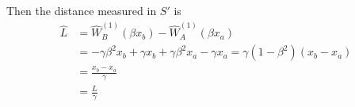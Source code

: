 \documentclass[12pt]{article}
\begin{document}
Then the distance measured in $S'$ is $$\begin{aligned}
\widehat{L} & =  \widehat{W}_B^{(1)}(\beta x_b) - \widehat{W}_A^{(1)}(\beta x_a)\\
   & = -\gamma\beta^2 x_b + \gamma x_b + \gamma \beta^2 x_a - \gamma x_a  = \gamma(1 - \beta^2)(x_b - x_a) \\
   &= \frac{x_b - x_a}{\gamma}\\
   &= \frac{L}{\gamma}
\end{aligned}$$
\end{document}
